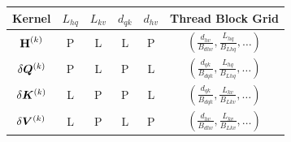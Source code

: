 \begin{tabular}{cccccc}
    \toprule
    Kernel             & $L_{hq}$ & $L_{kv}$ & $d_{qk}$ & $d_{hv}$ & Thread Block Grid                                                                  \\
    \midrule
    $\bm{\mathrm{H}}^{(k)}$   & P        & L        & L        & P        & $\left( \frac{d_{hv}}{B_{dhv}}, \frac{L_{hq}}{B_{Lhq}}, \dots\right)$ \\
    $\delta \bm{Q}^{(k)}$ & P        & L        & P        & L        & $\left( \frac{d_{qk}}{B_{dqk}}, \frac{L_{hq}}{B_{Lhq}}, \dots\right)$ \\
    $\delta \bm{K}^{(k)}$ & L        & P        & P        & L        & $\left( \frac{d_{qk}}{B_{dqk}}, \frac{L_{kv}}{B_{Lkv}}, \dots\right)$ \\
    $\delta \bm{V}^{(k)}$ & L        & P        & L        & P        & $\left( \frac{d_{hv}}{B_{dhv}}, \frac{L_{kv}}{B_{Lkv}}, \dots\right)$ \\
    \bottomrule
\end{tabular}
